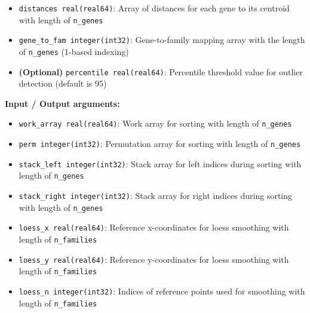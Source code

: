 \documentclass[11pt]{article}
\begin{document}
\begin{enumerate}
\begin{enumerate}
\begin{itemize}
	      	      	\item \texttt{distances real(real64)}: Array of distances for each gene
	      	      	      to its centroid with length of \texttt{n\_genes}
	      	      	      
	      	      	\item \texttt{gene\_to\_fam integer(int32)}: Gene-to-family mapping array
	      	      	      with the length of \texttt{n\_genes} (1-based indexing)
	      	      	      
	      	      	\item \textbf{(Optional)} \texttt{percentile real(real64)}:
	      	      	      Percentile threshold value for outlier detection (default is 95)
	      	      \end{itemize}
	      	      
	      	      \textbf{Input / Output arguments:}
	      	      \begin{itemize}
	      	      	\item \texttt{work\_array real(real64)}: Work array for sorting with
	      	      	      length of \texttt{n\_genes}
	      	      	      
	      	      	\item \texttt{perm integer(int32)}: Permutation array for sorting with
	      	      	      length of \texttt{n\_genes}
	      	      	      
	      	      	\item \texttt{stack\_left integer(int32)}: Stack array for left indices
	      	      	      during sorting with length of \texttt{n\_genes}
	      	      	      
	      	      	\item \texttt{stack\_right integer(int32)}: Stack array for right indices
	      	      	      during sorting with length of \texttt{n\_genes}
	      	      	      
	      	      	\item \texttt{loess\_x real(real64)}: Reference x-coordinates for loess
	      	      	      smoothing with length of \texttt{n\_families}
	      	      	      
	      	      	\item \texttt{loess\_y real(real64)}: Reference y-coordinates for loess
	      	      	      smoothing with length of \texttt{n\_families}
	      	      	      
	      	      	\item \texttt{loess\_n integer(int32)}: Indices of reference points used
	      	      	      for smoothing with length of \texttt{n\_families}
	      	      \end{itemize}
	      	      

\end{enumerate}
\end{enumerate}
\end{document}
